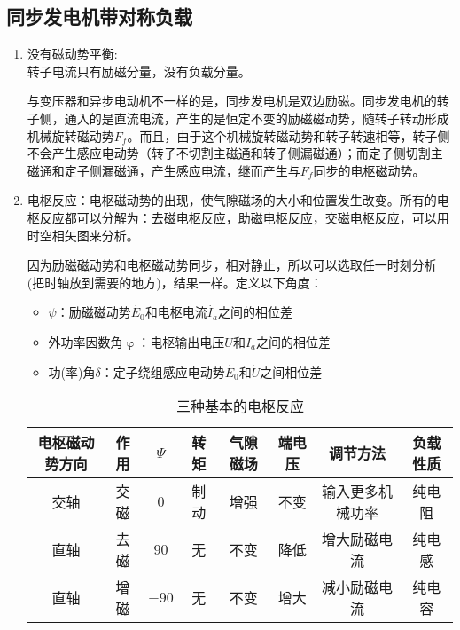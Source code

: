 \documentclass[blue]{elegantnote}
\begin{document}
\subsection{同步发电机带对称负载}
\begin{enumerate}
	\item {\color{thid}没有磁动势平衡}:\\
	转子电流只有励磁分量，没有负载分量。
	\begin{note}
		与变压器和异步电动机不一样的是，同步发电机是双边励磁。同步发电机的转子侧，通入的是直流电流，产生的是恒定不变的励磁磁动势，随转子转动形成机械旋转磁动势$F_f$。而且，由于这个机械旋转磁动势和转子转速相等，转子侧不会产生感应电动势（转子不切割主磁通和转子侧漏磁通）；而定子侧切割主磁通和定子侧漏磁通，产生感应电流，继而产生与$F_f$同步的电枢磁动势。	
	\end{note}	
	\item 电枢反应：电枢磁动势的出现，使气隙磁场的大小和位置发生改变。所有的电枢反应都可以分解为：去磁电枢反应，助磁电枢反应，交磁电枢反应，可以用时空相矢图来分析。
	\begin{note}	
		因为励磁磁动势和电枢磁动势同步，相对静止，所以可以选取任一时刻分析(把时轴放到需要的地方)，结果一样。定义以下角度：
		\begin{itemize}
			\item $\psi$：励磁磁动势$\dot{E_0}$和电枢电流$\dot{I_a}$之间的相位差
			\item 外功率因数角$\upvarphi$：电枢输出电压$\dot{U}$和$\dot{I_a}$之间的相位差
			\item 功(率)角$\delta$：定子绕组感应电动势$\dot{E_0}$和$\dot{U}$之间相位差
		\end{itemize}
	\end{note}
	\begin{table}[!htbp]
		\centering
		\caption{三种基本的电枢反应}
		\begin{tabular}{|c|c|c|c|c|c|c|c|}
			\hline
			电枢磁动势方向 & 作用    & $\Psi$ & 转矩 & 气隙磁场  & 端电压   & 调节方法  & 负载性质 \\\hline
			交轴    & 交磁    & $0$\textdegree & 制动    & 增强 & 不变    & 输入更多机械功率 & 纯电阻 \\\hline
			直轴    & 去磁    & $90$\textdegree & 无     & 不变    & 降低    & 增大励磁电流 & 纯电感 \\\hline
			直轴    & 增磁    & $-90$\textdegree & 无     & 不变    & 增大    & 减小励磁电流 & 纯电容 \\\hline
		\end{tabular}%
		\label{tab:addlabel1}%
	\end{table}%

\end{enumerate}
\end{document}

